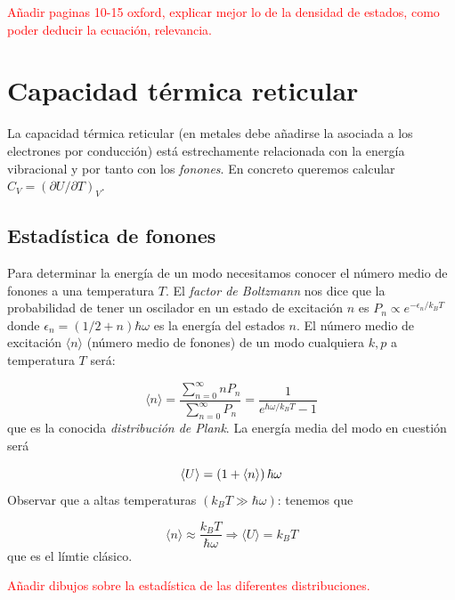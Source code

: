 \begin{Anotacion}
	\textcolor{red}{Añadir paginas 10-15 oxford, explicar mejor lo de la densidad de estados, como poder deducir la ecuación, relevancia.}
\end{Anotacion}


\section{Capacidad térmica reticular}

La capacidad térmica reticular (en metales debe añadirse la asociada a los electrones por conducción) está estrechamente relacionada con la energía vibracional y por tanto con los \textit{fonones}. En concreto queremos calcular $C_V = (\partial U / \partial T)_V$. 

\subsection{Estadística de fonones}

Para determinar la energía de un modo necesitamos conocer el número medio de fonones a una temperatura $T$. El \textit{factor de Boltzmann} nos dice que la probabilidad de tener un oscilador en un estado de excitación $n$ es $P_n \propto e^{-\epsilon_n/k_B T}$ donde $\epsilon_n = (1/2+n)\hbar \omega$ es la energía del estados $n$. El número medio de excitación $\langle n \rangle$ (número medio de fonones) de un modo cualquiera $k,p$ a temperatura $T$ será:

\begin{equation}
    \langle n \rangle = \frac{\sum_{n=0}^\infty n P_n}{\sum_{n=0}^{\infty} P_n} = \frac{1}{e^{\hbar \omega/k_B T} -1}
\end{equation}
que es la conocida \textit{distribución de Plank}. La energía media del modo en cuestión será

\begin{equation}
    \langle U \rangle = \left( 1+\langle n \rangle \right) \hbar \omega
\end{equation}
Observar que a altas temperaturas $(k_B T \gg \hbar \omega)$: tenemos que

\begin{equation}
    \langle n \rangle \approx \frac{k_B T}{\hbar \omega} \Longrightarrow \langle U \rangle = k_B T
\end{equation}
que es el límtie clásico. 
\begin{Anotacion}
	\textcolor{red}{Añadir dibujos sobre la estadística de las diferentes distribuciones.}
\end{Anotacion}


